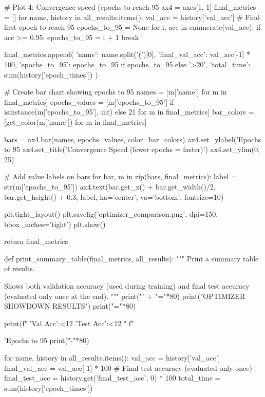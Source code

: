 \documentclass[../../main.tex]{subfiles}
\begin{document}
\begin{pythoncode}
    # Plot 4: Convergence speed (epochs to reach 95%
    ax4 = axes[1, 1]
    final_metrics = []
    for name, history in all_results.items():
        val_acc = history['val_acc']
        # Find first epoch to reach 95%
        epochs_to_95 = None
        for i, acc in enumerate(val_acc):
            if acc >= 0.95:
                epochs_to_95 = i + 1
                break

        final_metrics.append({
            'name': name.split('(')[0],
            'final_val_acc': val_acc[-1] * 100,
            'epochs_to_95': epochs_to_95 if epochs_to_95 else '>20',
            'total_time': sum(history['epoch_times'])
        })

    # Create bar chart showing epochs to 95%
    names = [m['name'] for m in final_metrics]
    epochs_values = [m['epochs_to_95'] if isinstance(m['epochs_to_95'], int)
                     else 21 for m in final_metrics]
    bar_colors = [get_color(m['name']) for m in final_metrics]

    bars = ax4.bar(names, epochs_values, color=bar_colors)
    ax4.set_ylabel('Epochs to 95%
    ax4.set_title('Convergence Speed (fewer epochs = faster)')
    ax4.set_ylim(0, 25)

    # Add value labels on bars
    for bar, m in zip(bars, final_metrics):
        label = str(m['epochs_to_95'])
        ax4.text(bar.get_x() + bar.get_width()/2, bar.get_height() + 0.3,
                label, ha='center', va='bottom', fontsize=10)

    plt.tight_layout()
    plt.savefig('optimizer_comparison.png', dpi=150, bbox_inches='tight')
    plt.show()

    return final_metrics


def print_summary_table(final_metrics, all_results):
    """
    Print a summary table of results.

    Shows both validation accuracy (used during training) and
    final test accuracy (evaluated only once at the end).
    """
    print("\n" + "="*80)
    print("OPTIMIZER SHOWDOWN RESULTS")
    print("="*80)

    print(f" {'Val Acc':<12} {'Test Acc':<12} "
          f"{'Epochs to 95%
    print("-"*80)

    for name, history in all_results.items():
        val_acc = history['val_acc']
        final_val_acc = val_acc[-1] * 100
        # Final test accuracy (evaluated only once)
        final_test_acc = history.get('final_test_acc', 0) * 100
        total_time = sum(history['epoch_times'])

}
\end{pythoncode}
\end{document}
